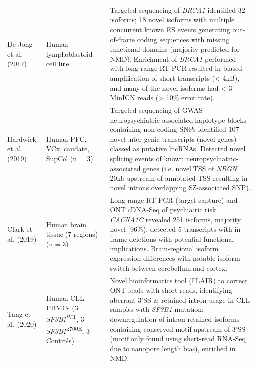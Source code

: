 \begin{landscape}
\begin{longtable}[c]{p{4cm}p{4cm}p{18cm}}
		\centering De Jong et al. (2017)\cite{DeJong2017}  &
		\centering Human lymphoblastoid cell line &
		\tabitem Targeted sequencing of \textit{BRCA1} identified 32 isoforms; 18 novel isoforms with multiple concurrent known ES events generating out-of-frame coding sequences with missing functional domains (majority predicted for NMD). \newline
		\tabitem Enrichment of \textit{BRCA1} performed with long-range RT-PCR resulted in biased amplification of short transcripts (< 4kB), and many of the novel isoforms had < 3 MinION reads (> 10\% error rate).  \\
		\hdashline[0.5pt/5pt]
		
		\centering Hardwick et al. (2019) \cite{Hardwick2019a} &
		\centering Human PFC, VCx, \newline caudate, SupCol (n = 3)  &
		\tabitem Targeted sequencing of GWAS neuropsychiatric-associated haplotype blocks containing non-coding SNPs identified 107 novel inter-genic transcripts (novel genes) classed as putative lncRNAs. \newline 
		\tabitem Detected novel splicing events of known neuropsychiatric-associated genes (i.e. novel TSS of \textit{NRGN} 20kb upstream of annotated TSS resulting in novel introns overlapping SZ-associated SNP).  \\
		\hdashline[0.5pt/5pt]
		
		\centering Clark et al. (2019) \cite{Clark2019} &
		\centering Human brain tissue \newline (7 regions) (n = 3) &
		\tabitem Long-range RT-PCR (target capture) and ONT cDNA-Seq of psychiatric risk \textit{CACNA1C} revealed 251 isoforms, majority novel (96\%); detected 5 transcripts with in-frame deletions with potential functional implications.  \newline 
		\tabitem Brain-regional isoform expression differences with notable isoform switch between cerebellum and cortex.  \\
		\hdashline[0.5pt/5pt]
		
		\centering Tang et al. (2020) \cite{Tang2020} &
		\centering Human CLL PBMCs \newline (3 \textit{SF3B1}\textsuperscript{WT}, 3 \textit{SF3B1}\textsuperscript{k700E}, 3 Controls) &
		\tabitem Novel bioinformatics tool (FLAIR) to correct ONT reads with short reads, identifying aberrant 3'SS \& retained intron usage in CLL samples with \textit{SF3B1} mutation; downregulation of intron-retained isoforms containing conserved motif upstream of 3'SS (motif only found using short-read RNA-Seq due to nanopore length bias), enriched in NMD.  \\
		

\end{longtable}
\end{landscape}
